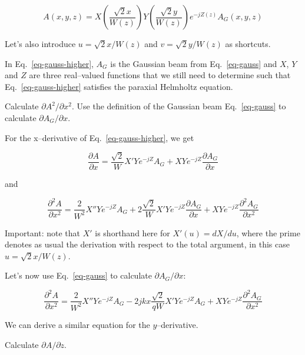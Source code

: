 \begin{equation}
A(x,y,z) = X\left({\frac{\sqrt{2}x}{W(z)}}\right) Y\left({\frac{\sqrt{2}y}{W(z)}}\right) e^{-jZ(z)} A_G(x,y,z) \label{eq-gauss-higher}
\end{equation} 

Let's also introduce $u = \sqrt{2} x / W(z)$ and  $v = \sqrt{2} y / W(z)$ as shortcuts. 

In Eq.~\ref{eq-gauss-higher}, $A_G$ is the Gaussian beam from Eq.~\ref{eq-gauss} and $X$, $Y$ and $Z$ are three real--valued functions that we still need to determine such that Eq.~\ref{eq-gauss-higher} satisfies the paraxial Helmholtz equation.


\begin{cue}
Calculate $\partial A^2 / \partial x^2$. Use the definition of the Gaussian beam Eq.~\ref{eq-gauss} to calculate $\partial A_G / \partial x$. 
\end{cue}
  
For the x--derivative of Eq.~\ref{eq-gauss-higher}, we get

\begin{equation}
\frac{\partial A}{\partial x} = \frac{\sqrt{2}}{W}X'Ye^{-jZ} A_G + XYe^{-jZ} \frac{\partial A_G}{\partial x} 
\end{equation} 

and

\begin{equation}
\frac{\partial^2 A}{\partial x^2} = \frac{2}{W^2}X''Ye^{-jZ} A_G  + 2\frac{\sqrt{2}}{W}X'Ye^{-jZ} \frac{\partial A_G}{\partial x}  + XYe^{-jZ} \frac{\partial^2 A_G}{\partial x^2}
\end{equation} 

Important: note that $X'$ is shorthand here for $X'(u)=dX/du$, where the prime denotes as usual the derivation with respect to the total argument, in this case $u=\sqrt{2}x/W(z)$.

Let's now use Eq.~\ref{eq-gauss} to calculate $\partial A_G / \partial x$:

\begin{equation}
\frac{\partial^2 A}{\partial x^2} = \frac{2}{W^2}X''Ye^{-jZ} A_G  - 2j k x \frac{\sqrt{2}}{qW}X'Ye^{-jZ}A_G  + XYe^{-jZ} \frac{\partial^2 A_G}{\partial x^2} \label{eq-hermite-gauss-1}
\end{equation} 

We can derive a similar equation for the $y$--derivative.

\begin{cue}
Calculate $\partial A / \partial z$.
\end{cue}

